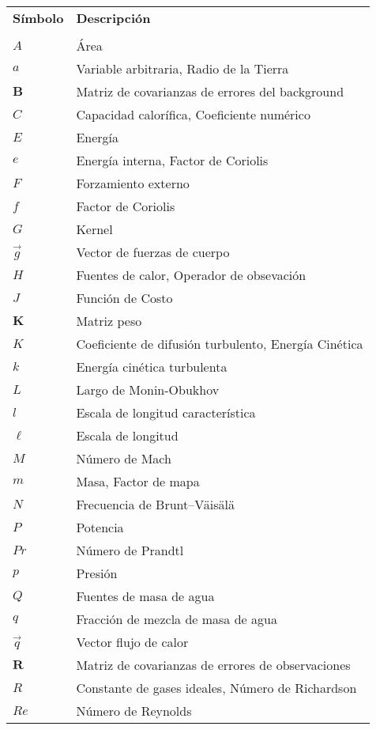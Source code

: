
\begin{tabular}{ll}
	\textbf{Símbolo} & \textbf{Descripción} \\
	& \\
	$A$ & Área   \\
	$a$ & Variable arbitraria, Radio de la Tierra   \\
	$\textbf{B}$ & Matriz de covarianzas de errores del background \\
	$C$ &  Capacidad calorífica, Coeficiente numérico   \\ 
	$E$ & Energía  \\
	$e$ &  Energía interna, Factor de Coriolis   \\
	$F$ & Forzamiento externo   \\
	$f$ & Factor de Coriolis \\
	$G$ & Kernel \\
	$\vec g$ & Vector de fuerzas de cuerpo     \\
	$H$ & Fuentes de calor, Operador de obsevación  \\
	$J$ & Función de Costo \\
	$\textbf{K}$ & Matriz peso \\
	$K$ & Coeficiente de difusión turbulento, Energía Cinética   \\
	$k$ &   Energía cinética turbulenta	\\
	$L$ &  Largo de Monin-Obukhov    \\
	$l$ & Escala de longitud característica  \\
	$\ell$ & Escala de longitud \\
	$M$ & Número de Mach     \\
	$m$ & Masa, Factor de mapa    \\
	$N$ &  Frecuencia de Brunt–Väisälä    \\
	$P$ & Potencia    \\
	$Pr$ & Número de Prandtl    \\
	$p$ & Presión     \\
	$Q$ & Fuentes de masa de agua     \\
	$q$ &   Fracción de mezcla de masa de agua   \\
	$\vec{q}$ &  Vector flujo de calor   \\
	$\textbf{R}$ & Matriz de covarianzas de errores de observaciones \\
	$R$ &   Constante de gases ideales, Número de Richardson   \\
	$Re$ & Número de Reynolds    \\
\end{tabular}
